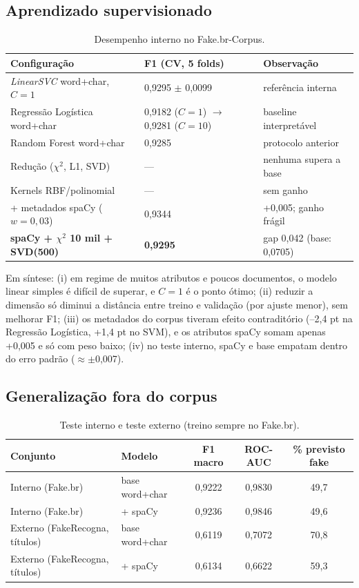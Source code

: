 \documentclass[brazilian,11pt,a4paper]{article}
\begin{document}
\subsection{Aprendizado supervisionado}

\begin{table}[h]
\centering
\small
\begin{tabular}{@{}p{6.2cm}p{3.2cm}p{4.6cm}@{}}
\toprule
\textbf{Configuração} & \textbf{F1 (CV, 5 folds)} & \textbf{Observação}\\
\midrule
\textit{LinearSVC} word+char, $C{=}1$ & 0,9295 $\pm$ 0,0099 & referência interna\\
Regressão Logística word+char & 0,9182 ($C{=}1$) $\to$ 0,9281 ($C{=}10$) & baseline interpretável\\
Random Forest word+char & 0,9285 & protocolo anterior\\
Redução ($\chi^2$, L1, SVD) & --- & nenhuma supera a base\\
Kernels RBF/polinomial & --- & sem ganho\\
+ metadados spaCy ($w{=}0{,}03$) & 0,9344 & +0,005; ganho frágil\\
\textbf{spaCy + $\chi^2$ 10 mil + SVD(500)} & \textbf{0,9295} & gap 0,042 (base: 0,0705)\\
\bottomrule
\end{tabular}
\caption{Desempenho interno no Fake.br-Corpus.}
\end{table}

Em síntese: (i) em regime de muitos atributos e poucos documentos, o modelo linear simples é difícil de superar, e $C{=}1$ é o ponto ótimo; (ii) reduzir a dimensão só diminui a distância entre treino e validação (por ajuste menor), sem melhorar F1; (iii) os metadados do corpus tiveram efeito contraditório (--2,4 pt na Regressão Logística, +1,4 pt no SVM), e os atributos spaCy somam apenas +0,005 e só com peso baixo; (iv) no teste interno, spaCy e base empatam dentro do erro padrão ($\approx\pm$0,007).

\subsection{Generalização fora do corpus}

\begin{table}[h]
\centering
\small
\begin{tabular}{@{}llccc@{}}
\toprule
\textbf{Conjunto} & \textbf{Modelo} & \textbf{F1 macro} & \textbf{ROC-AUC} & \textbf{\% previsto fake}\\
\midrule
Interno (Fake.br) & base word+char & 0,9222 & 0,9830 & 49,7\\
Interno (Fake.br) & + spaCy & 0,9236 & 0,9846 & 49,6\\
Externo (FakeRecogna, títulos) & base word+char & 0,6119 & 0,7072 & 70,8\\
Externo (FakeRecogna, títulos) & + spaCy & 0,6134 & 0,6622 & 59,3\\
\bottomrule
\end{tabular}
\caption{Teste interno e teste externo (treino sempre no Fake.br).}
\end{table}
\end{document}
